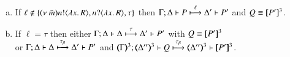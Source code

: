 \begin{proposition}
\begin{enumerate}
\begin{enumerate}[a)]
				\item	If $\ell \notin \{(\nu\ \tilde{m}) n ! \langle \lambda x.\,R \rangle, n ? \langle \lambda x.\,R \rangle, \tau\}$
					then
					$\Gamma; \Delta \vdash P \stackrel{\ell}{\longmapsto} \Delta' \vdash P'$ and $Q \equiv [\!\![P']\!\!]^{3}$.

				\item	If $\ell = \tau$ then
					either
					$\Gamma; \Delta \vdash \Delta \stackrel{\tau}{\longmapsto} \Delta' \vdash P'$ with $Q \equiv [\!\![P']\!\!]^{3}$\\
					or
					$\Gamma; \Delta \vdash \Delta \stackrel{\tau_{\beta}}{\longmapsto} \Delta' \vdash P'$ and
					$\horel{\tmap{\Gamma}{3}}{\tmap{\Delta''}{3}}{Q}{\hby{\btau}}
					{\tmap{\Delta''}{3}}{\pmap{P'}{3}}$.
			\end{enumerate}
	\end{enumerate}
\end{proposition}

